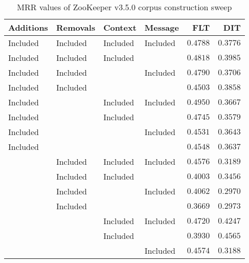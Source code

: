 
\begin{table}
\begin{spacing}{1.2}
\centering
\caption{MRR values of ZooKeeper v3.5.0 corpus construction sweep}
\label{table:zookeeper_corpus_sweep}
\vspace{0.2em}
\begin{tabular}{llll|rr}
\toprule
Additions &  Removals &   Context &   Message & FLT &        DIT \\
\midrule
 Included &  Included &  Included &  Included &         $0.4788$ &      $0.3776$ \\
 \myrowcolor Included &  Included &  Included &           &         $0.4818$ &      $0.3985$ \\
 Included &  Included &           &  Included &         $0.4790$ &      $0.3706$ \\
 Included &  Included &           &           &         $0.4503$ &      $0.3858$ \\
 Included &           &  Included &  Included &    $\bm{0.4950}$ &      $0.3667$ \\
 Included &           &  Included &           &         $0.4745$ &      $0.3579$ \\
 Included &           &           &  Included &         $0.4531$ &      $0.3643$ \\
 Included &           &           &           &         $0.4548$ &      $0.3637$ \\
          &  Included &  Included &  Included &         $0.4576$ &      $0.3189$ \\
          &  Included &  Included &           &         $0.4003$ &      $0.3456$ \\
          &  Included &           &  Included &         $0.4062$ &      $0.2970$ \\
          &  Included &           &           &         $0.3669$ &      $0.2973$ \\
          &           &  Included &  Included &         $0.4720$ &      $0.4247$ \\
          &           &  Included &           &         $0.3930$ & $\bm{0.4565}$ \\
          &           &           &  Included &         $0.4574$ &      $0.3188$ \\
\bottomrule
\end{tabular}

\end{spacing}
\end{table}

